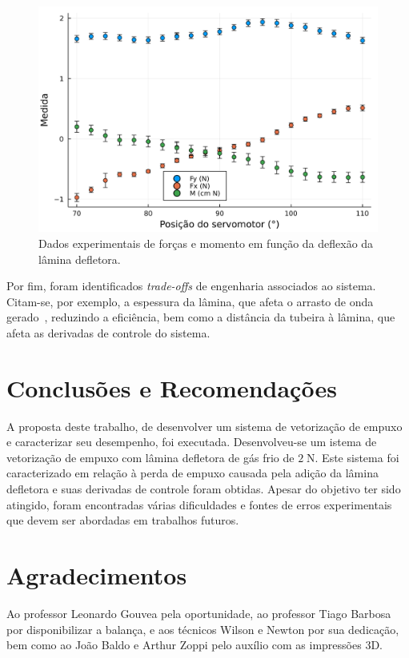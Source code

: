 \documentclass[
	article,			%
	10pt,				%
	oneside,			%
	a4paper,			%
  twocolumn,			%
	english,			%
	brazil,				%
	sumario=tradicional,
	]{abntex2}
\begin{document}
\begin{figure}[htbp]
  \centering
  \includegraphics[width=.7\linewidth]{../report/img/results/exp10_5bar_110_a_70.png}
  \caption{Dados experimentais de forças e momento em função da deflexão da lâmina defletora.}\label{fig:data}
\end{figure}

Por fim, foram identificados \textit{trade-offs} de engenharia associados ao sistema. Citam-se, por exemplo, a espessura da lâmina, que afeta o arrasto de onda gerado~\cite{anderson}, reduzindo a eficiência, bem como a distância da tubeira à lâmina, que afeta as derivadas de controle do sistema.

\section{Conclusões e Recomendações}

A proposta deste trabalho, de desenvolver um sistema de vetorização de empuxo e caracterizar seu desempenho, foi executada. Desenvolveu-se um istema de vetorização de empuxo com lâmina defletora de gás frio de \(2\;\mathrm{N} \). Este sistema foi caracterizado em relação à perda de empuxo causada pela adição da lâmina defletora e suas derivadas de controle foram obtidas. Apesar do objetivo ter sido atingido, foram encontradas várias dificuldades e fontes de erros experimentais que devem ser abordadas em trabalhos futuros.

\section{Agradecimentos}

Ao professor Leonardo Gouvea pela oportunidade, ao professor Tiago Barbosa por disponibilizar a balança, e aos técnicos Wilson e Newton por sua dedicação, bem como ao João Baldo e Arthur Zoppi pelo auxílio com as impressões 3D.

\end{document}
